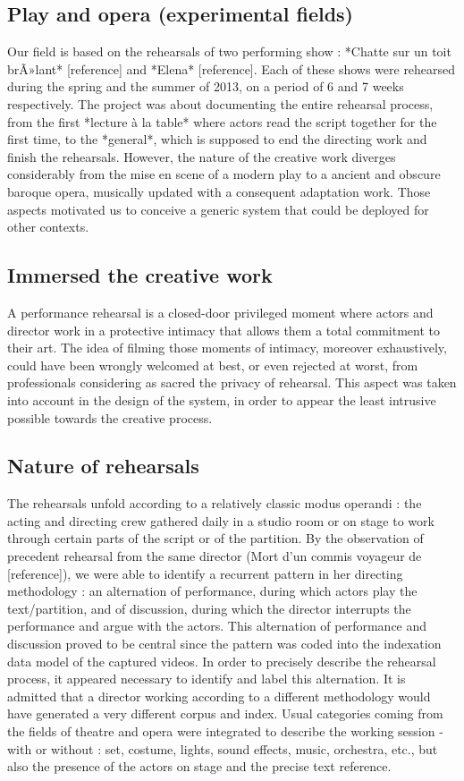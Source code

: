 \documentclass[conference]{IEEEtran}
\begin{document}
\subsection{Play and opera (experimental fields)}

Our field is based on the rehearsals of two performing show : *Chatte sur un toit brÃ»lant* [reference] and *Elena* [reference].
Each of these shows were rehearsed during the spring and the summer of 2013, on a period of 6 and 7 weeks respectively. The project was about documenting the entire rehearsal process, from the first *lecture à la table* where actors read the script together for the first time, to the *general*, which is supposed to end the directing work and finish the rehearsals.
However, the nature of the creative work diverges considerably from the mise en scene of a modern play to a ancient and obscure baroque opera, musically updated with a consequent adaptation work.
Those aspects motivated us to conceive a generic system that could be deployed for other contexts.

\subsection{Immersed the creative work}

A performance rehearsal is a closed-door privileged moment where actors and director work in a protective intimacy that allows them a total commitment to their art. The idea of filming those moments of intimacy, moreover exhaustively, could have been wrongly welcomed at best, or even rejected at worst, from professionals considering as sacred the privacy of rehearsal.
This aspect was taken into account in the design of the system, in order to appear the least intrusive possible towards the creative process.

\subsection{Nature of rehearsals}

The rehearsals unfold according to a relatively classic modus operandi : the acting and directing crew gathered daily in a studio room or on stage to work through certain parts of the script or of the partition. By the observation of precedent rehearsal from the same director (Mort d'un commis voyageur de [reference]), we were able to identify a recurrent pattern in her directing methodology : an alternation of performance, during which actors play the text/partition, and of discussion, during which the director interrupts the performance and argue with the actors. This alternation of performance and discussion proved to be central since the pattern was coded into the indexation data model of the captured videos.
In order to precisely describe the rehearsal process, it appeared necessary to identify and label this alternation.
It is admitted that a director working according to a different methodology would have generated a very different corpus and index.
Usual categories coming from the fields of theatre and opera were integrated to describe the working session - with or without : set, costume, lights, sound effects, music, orchestra, etc., but also the presence of the actors on stage and the precise text reference.
\end{document}
